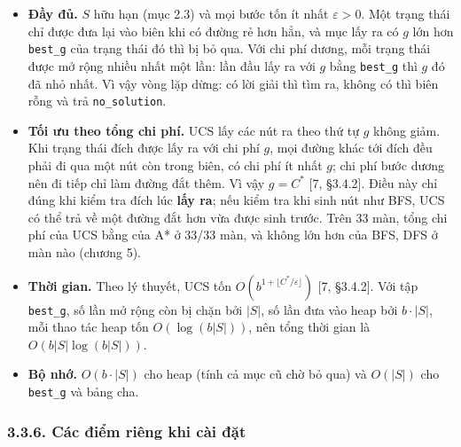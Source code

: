 \begin{itemize}
\tightlist
\item
  \textbf{Đầy đủ.} \(S\) hữu hạn (mục 2.3) và mọi bước tốn ít nhất \(\varepsilon > 0\). Một trạng thái chỉ được đưa lại vào biên khi có đường rẻ hơn hẳn, và mục lấy ra có \(g\) lớn hơn \texttt{best\_\allowbreak{}g} của trạng thái đó thì bị bỏ qua. Với chi phí dương, mỗi trạng thái được mở rộng nhiều nhất một lần: lần đầu lấy ra với \(g\) bằng \texttt{best\_\allowbreak{}g} thì \(g\) đó đã nhỏ nhất. Vì vậy vòng lặp dừng: có lời giải thì tìm ra, không có thì biên rỗng và trả \texttt{no\_\allowbreak{}solution}.
\item
  \textbf{Tối ưu theo tổng chi phí.} UCS lấy các nút ra theo thứ tự \(g\) không giảm. Khi trạng thái đích được lấy ra với chi phí \(g\), mọi đường khác tới đích đều phải đi qua một nút còn trong biên, có chi phí ít nhất \(g\); chi phí bước dương nên đi tiếp chỉ làm đường đắt thêm. Vì vậy \(g = C^*\) {[}7, §3.4.2{]}. Điều này chỉ đúng khi kiểm tra đích lúc \textbf{lấy ra}; nếu kiểm tra khi sinh nút như BFS, UCS có thể trả về một đường đắt hơn vừa được sinh trước. Trên 33 màn, tổng chi phí của UCS bằng của A* ở 33/33 màn, và không lớn hơn của BFS, DFS ở màn nào (chương 5).
\item
  \textbf{Thời gian.} Theo lý thuyết, UCS tốn \(O(b^{1 + \lfloor C^*/\varepsilon \rfloor})\) {[}7, §3.4.2{]}. Với tập \texttt{best\_\allowbreak{}g}, số lần mở rộng còn bị chặn bởi \(|S|\), số lần đưa vào heap bởi \(b \cdot |S|\), mỗi thao tác heap tốn \(O(\log(b|S|))\), nên tổng thời gian là \(O(b|S| \log(b|S|))\).
\item
  \textbf{Bộ nhớ.} \(O(b \cdot |S|)\) cho heap (tính cả mục cũ chờ bỏ qua) và \(O(|S|)\) cho \texttt{best\_\allowbreak{}g} và bảng cha.
\end{itemize}

\subsubsection{3.3.6. Các điểm riêng khi cài đặt}

